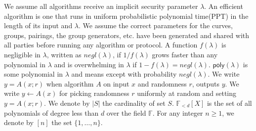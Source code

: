 \noindent We assume all algorithms receive an implicit security parameter $\lambda$. 
An efficient algorithm is one that runs in uniform probabilistic polynomial time(PPT) in the length of its input and $\lambda$. 
We assume the correct parameters for the curves, groups, pairings, the group generators, etc. have been generated and shared with all parties before running any algorithm or protocol. 
A function $f(\lambda)$ is negligible in $\lambda$, written as $\mathit{negl}(\lambda)$, if $1/f(\lambda)$ grows faster than 
any polynomial in $\lambda$ and is overwhelming in $\lambda$ if $1-f(\lambda)=\mathit{negl}(\lambda)$. $\mathsf{poly}(\lambda)$ 
is some polynomial in $\lambda$ and \ewnp means except with probability $\mathit{negl}(\lambda)$.
We write $y = A(x; r)$ when algorithm $A$ on input $x$ and randomness $r$, outputs $y$.
We write $y \leftarrow A(x)$ for picking randomness $r$ uniformly at random and setting $y = A(x; r)$. We denote by $|S|$ the cardinality of set $S$. 
$\mathbb{F}_{<d}[X]$ is the set of all polynomials of degree less than $d$ over the field $\mathbb{F}$. For any integer 
$n \geq 1$, we denote by $[n]$ the set $\{1, \ldots, n\}$.
\vspace{-0.015in}
